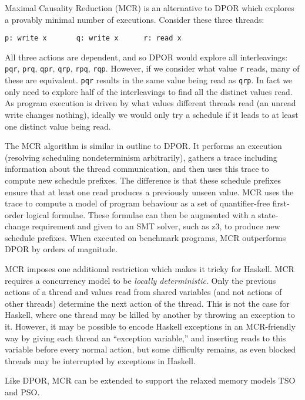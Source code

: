 Maximal Causality Reduction (MCR)\cite{huang2015,huang2017} is an alternative to
DPOR which explores a provably minimal number of executions.  Consider these
three threads:

\begin{center}
\verb|p: write x       q: write x      r: read x|
\end{center}

All three actions are dependent, and so DPOR would explore all interleavings:
\texttt{pqr}, \texttt{prq}, \texttt{qpr}, \texttt{qrp}, \texttt{rpq}, \texttt{rqp}.
However, if we consider what value \texttt{r} reads, many of these are
equivalent.  \texttt{pqr} results in the same value being read as \texttt{qrp}.
In fact we only need to explore half of the interleavings to find all the
distinct values read.  As program execution is driven by what values different
threads read (an unread write changes nothing), ideally we would only try a
schedule if it leads to at least one distinct value being read.

The MCR algorithm is similar in outline to DPOR\@.  It performs an execution
(resolving scheduling nondeterminism arbitrarily), gathers a trace including
information about the thread communication, and then uses this trace to compute
new schedule prefixes.  The difference is that these schedule prefixes ensure
that at least one read produces a previously unseen value.  MCR uses the trace
to compute a model of program behaviour as a set of quantifier-free first-order
logical formulae.  These formulae can then be augmented with a state-change
requirement and given to an SMT solver, such as z3, to produce new schedule
prefixes.  When executed on benchmark programs, MCR outperforms DPOR by orders
of magnitude\cite{huang2017}.

MCR imposes one additional restriction which makes it tricky for
Haskell.  MCR requires a concurrency model to be \emph{locally
  deterministic}\cite{huang2015}.  Only the previous actions of a
thread and values read from shared variables (and not actions of other
threads) determine the next action of the thread.  This is not the
case for Haskell, where one thread may be killed by another by
throwing an exception to it.  However, it may be possible to encode
Haskell exceptions in an MCR-friendly way by giving each thread an
``exception variable,'' and inserting reads to this variable before
every normal action, but some difficulty remains, as even blocked
threads may be interrupted by exceptions in Haskell.

Like DPOR, MCR can be extended to support the relaxed memory models TSO and
PSO\cite{huang2016}.

